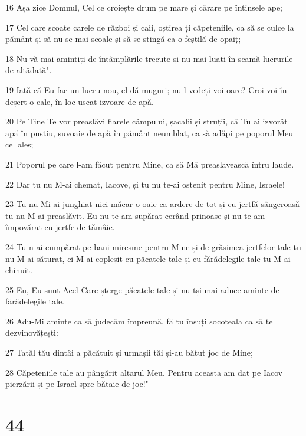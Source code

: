 \par 16 Așa zice Domnul, Cel ce croiește drum pe mare și cărare pe întinsele ape;
\par 17 Cel care scoate carele de război și caii, oștirea ți căpeteniile, ca să se culce la pământ și să nu se mai scoale și să se stingă ca o feștilă de opaiț;
\par 18 Nu vă mai amintiți de întâmplările trecute și nu mai luați în seamă lucrurile de altădată".
\par 19 Iată că Eu fac un lucru nou, el dă muguri; nu-l vedeți voi oare? Croi-voi în deșert o cale, în loc uscat izvoare de apă.
\par 20 Pe Tine Te vor preaslăvi fiarele câmpului, șacalii și struții, că Tu ai izvorât apă în pustiu, șuvoaie de apă în pământ neumblat, ca să adăpi pe poporul Meu cel ales;
\par 21 Poporul pe care l-am făcut pentru Mine, ca să Mă preaslăvească întru laude.
\par 22 Dar tu nu M-ai chemat, Iacove, și tu nu te-ai ostenit pentru Mine, Israele!
\par 23 Tu nu Mi-ai junghiat nici măcar o oaie ca ardere de tot și cu jertfă sângeroasă tu nu M-ai preaslăvit. Eu nu te-am supărat cerând prinoase și nu te-am împovărat cu jertfe de tămâie.
\par 24 Tu n-ai cumpărat pe bani miresme pentru Mine și de grăsimea jertfelor tale tu nu M-ai săturat, ci M-ai copleșit cu păcatele tale și cu fărădelegile tale tu M-ai chinuit.
\par 25 Eu, Eu sunt Acel Care șterge păcatele tale și nu tși mai aduce aminte de fărădelegile tale.
\par 26 Adu-Mi aminte ca să judecăm împreună, fă tu însuți socoteala ca să te dezvinovățești:
\par 27 Tatăl tău dintâi a păcătuit și urmașii tăi și-au bătut joc de Mine;
\par 28 Căpeteniile tale au pângărit altarul Meu. Pentru aceasta am dat pe Iacov pierzării și pe Israel spre bătaie de joc!"

\chapter{44}

